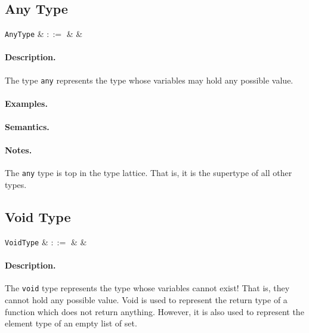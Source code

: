 
\subsection{Any Type}

\begin{syntax}
  \verb+AnyType+ & $::=$ &  &\\
\end{syntax}

\paragraph{Description.}  The type \lstinline{any} represents the type whose variables may hold any possible value.

\paragraph{Examples.}

\paragraph{Semantics.}

\paragraph{Notes.} The \lstinline{any} type is top in the type
lattice.  That is, it is the supertype of all other types.


\subsection{Void Type}

\begin{syntax}
   \verb+VoidType+ & $::=$ &  &\\
\end{syntax}

\paragraph{Description.} The \lstinline{void} type represents the type whose variables cannot exist! That is, they cannot hold any possible value. Void is used to represent the return type of a function which does not return anything. However, it is also
used to represent the element type of an empty list of set. 

